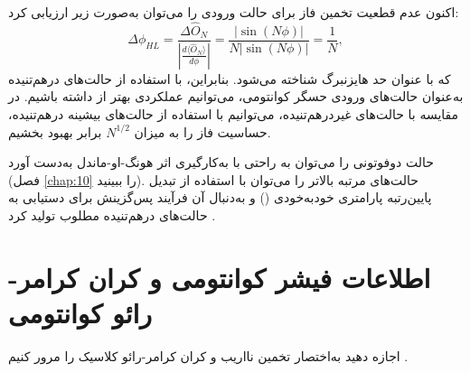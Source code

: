 اکنون عدم قطعیت تخمین فاز برای حالت ورودی  را می‌توان به‌صورت زیر ارزیابی کرد:
\begin{equation}
	\Delta \phi_{HL} = \frac{\Delta \hat{O}_N}{\left| \frac{d\langle \hat{O}_N \rangle}{d\phi} \right|} = \frac{|\sin(N\phi)|}{N|\sin(N\phi)|} = \frac{1}{N},
	\label{eq:11-36}
\end{equation}
که با عنوان حد هایزنبرگ شناخته می‌شود. بنابراین، با استفاده از حالت‌های درهم‌تنیده به‌عنوان حالت‌های ورودی حسگر کوانتومی، می‌توانیم عملکردی بهتر از  داشته باشیم. در مقایسه با حالت‌های غیردرهم‌تنیده، می‌توانیم با استفاده از حالت‌های بیشینه درهم‌تنیده، حساسیت فاز را به میزان $N^{1/2}$ برابر بهبود بخشیم.

حالت  دوفوتونی را می‌توان به راحتی با به‌کارگیری اثر هونگ-او-ماندل \cite{8,9} به‌دست آورد (فصل \ref{chap:10} را ببینید). حالت‌های  مرتبه بالاتر را می‌توان با استفاده از تبدیل پایین‌رتبه پارامتری خودبه‌خودی () \cite{9,10,11,12,13} و به‌دنبال آن فرآیند پس‌گزینش برای دستیابی به حالت‌های درهم‌تنیده مطلوب تولید کرد \cite{14,15,16,17}.

\section{اطلاعات فیشر کوانتومی و کران کرامر-رائو کوانتومی}
\label{sec:11-2}
اجازه دهید به‌اختصار تخمین نااریب و کران کرامر-رائو کلاسیک را مرور کنیم \cite{6, 18, 19}.

